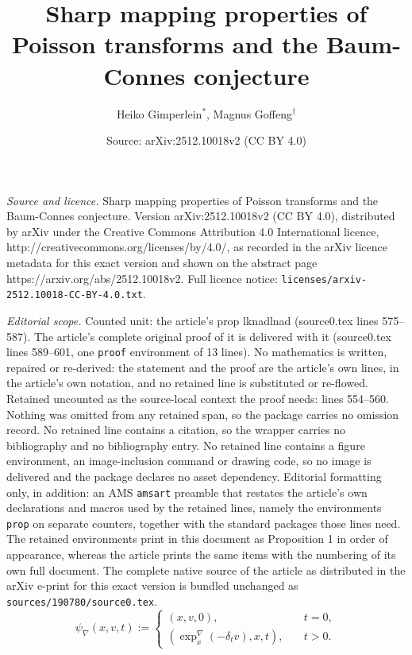 \documentclass[10pt,a4paper]{amsart}
\title{Sharp mapping properties of Poisson transforms and the Baum-Connes conjecture}
\author{Heiko Gimperlein$^*$, Magnus Goffeng$^\dagger$}
\date{Source: arXiv:2512.10018v2 (CC BY 4.0)}
\begin{document}
\maketitle

\noindent\emph{Source and licence.} Sharp mapping properties of Poisson transforms and the Baum-Connes conjecture. Version arXiv:2512.10018v2 (CC BY 4.0), distributed by arXiv under the Creative Commons Attribution 4.0 International licence, http://creativecommons.org/licenses/by/4.0/, as recorded in the arXiv licence metadata for this exact version and shown on the abstract page https://arxiv.org/abs/2512.10018v2. Full licence notice: \texttt{licenses/arxiv-2512.10018-CC-BY-4.0.txt}.\par\smallskip

\noindent\textit{Editorial scope.} Counted unit: the article's prop lknadlnad (source0.tex lines 575--587). The article's complete original proof of it is delivered with it (source0.tex lines 589--601, one \texttt{proof} environment of 13 lines). No mathematics is written, repaired or re-derived: the statement and the proof are the article's own lines, in the article's own notation, and no retained line is substituted or re-flowed.  Retained uncounted as the source-local context the proof needs: lines 554--560.  Nothing was omitted from any retained span, so the package carries no omission record.  No retained line contains a citation, so the wrapper carries no bibliography and no bibliography entry.  No retained line contains a figure environment, an image-inclusion command or drawing code, so no image is delivered and the package declares no asset dependency.  Editorial formatting only, in addition: an AMS \texttt{amsart} preamble that restates the article's own declarations and macros used by the retained lines, namely the environments \texttt{prop} on separate counters, together with the standard packages those lines need.  The retained environments print in this document as Proposition 1 in order of appearance, whereas the article prints the same items with the numbering of its own full document.  The complete native source of the article as distributed in the arXiv e-print for this exact version is bundled unchanged as \texttt{sources/190780/source0.tex}.
\begin{equation}
\label{psinabladef}
\psi_\nabla(x,v,t):=
\begin{cases}
(x,v,0), \quad &t=0,\\
(\exp_x^\nabla(-\delta_tv),x,t), \quad &t>0.\end{cases}
\end{equation}
\end{document}
